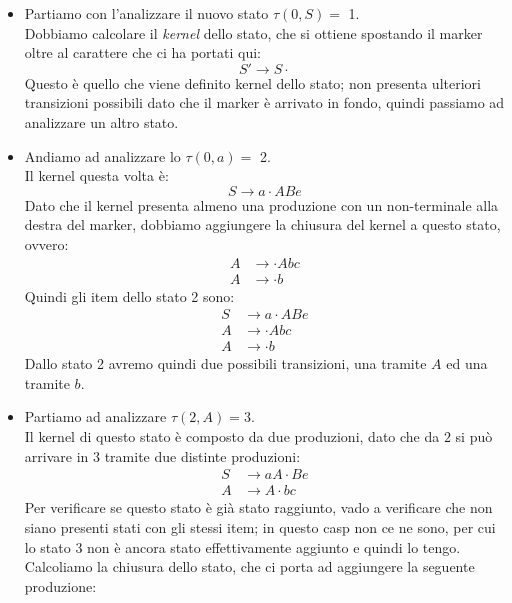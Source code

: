 \documentclass[class=book, crop=false, oneside, 12pt]{standalone}
\begin{document}
\begin{itemize}
    \item Partiamo con l'analizzare il nuovo stato \(\tau (0, S) =\) 1. \\
    Dobbiamo calcolare il \emph{kernel} dello stato, che si ottiene spostando il marker oltre al carattere che ci ha portati qui:
    \begin{equation*}
        S' \to S \cdot
    \end{equation*}
    Questo è quello che viene definito kernel dello stato; non presenta ulteriori transizioni possibili dato che il marker è arrivato in fondo, quindi passiamo ad analizzare un altro stato. 
    \item Andiamo ad analizzare lo \(\tau (0, a) =\) 2. \\
    Il kernel questa volta è:
    \begin{equation*}
        S \to a \cdot ABe
    \end{equation*}
    Dato che il kernel presenta almeno una produzione con un non-terminale alla destra del marker, dobbiamo aggiungere la chiusura del kernel a questo stato, ovvero:
    \begin{align*}
        A &\to \cdot Abc\\
        A &\to \cdot b
    \end{align*}
    Quindi gli item dello stato 2 sono:
    \begin{align*}
        S &\to a \cdot ABe\\
        A &\to \cdot Abc\\
        A &\to \cdot b
    \end{align*}
    Dallo stato 2 avremo quindi due possibili transizioni, una tramite \(A\) ed una tramite \(b\).
    \item Partiamo ad analizzare \(\tau (2, A) = 3\). \\
    Il kernel di questo stato è composto da due produzioni, dato che da \(2\) si può arrivare in \(3\) tramite due distinte produzioni:
    \begin{align*}
        S &\to aA \cdot Be \\
        A &\to A \cdot bc
    \end{align*}
    Per verificare se questo stato è già stato raggiunto, vado a verificare che non siano presenti stati con gli stessi item; in questo casp non ce ne sono, per cui lo stato \(3\) non è ancora stato effettivamente aggiunto e quindi lo tengo. Calcoliamo la chiusura dello stato, che ci porta ad aggiungere la seguente produzione:
    \begin{equation*}

\end{equation*}
\end{itemize}
\end{document}
